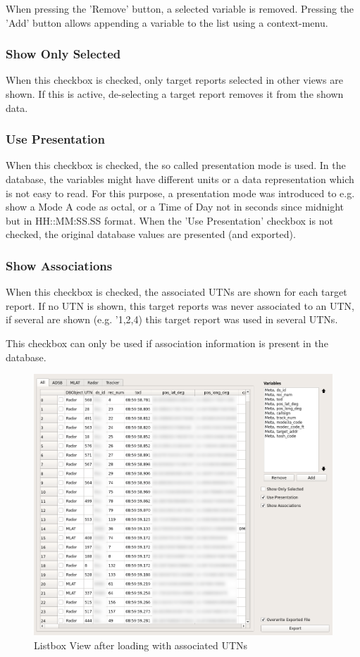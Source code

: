 When pressing the 'Remove' button, a selected variable is removed.  Pressing the 'Add' button allows appending a variable to the list using a context-menu.

\subsubsection{Show Only Selected}
When this checkbox is checked, only target reports selected in other views are shown. If this is active, de-selecting a target report removes it from the shown data.

\subsubsection{Use Presentation}
When this checkbox is checked, the so called presentation mode is used. In the database, the variables might have different units or a data representation which is not easy to read. For this purpose, a presentation mode was introduced to e.g. show a Mode A code as octal, or a Time of Day not in seconds since midnight but in HH::MM:SS.SS format. When the 'Use Presentation' checkbox is not checked, the original database values are presented (and exported).

\subsubsection{Show Associations}
When this checkbox is checked, the associated UTNs are shown for each target report. If no UTN is shown, this target reports was never associated to an UTN, if several are shown (e.g. '1,2,4) this target report was used in several UTNs. 

This checkbox can only be used if association information is present in the database.

\begin{figure}[H]
    \hspace*{-2cm}
    \includegraphics[width=18cm,frame]{../screenshots/listbox_loaded_assoc.png}
  \caption{Listbox View after loading with associated UTNs}
  \label{fig:listbox_load}
\end{figure}


